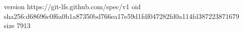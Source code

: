 version https://git-lfs.github.com/spec/v1
oid sha256:d68696c0f6a0b1a87350bd766ea17e59d1fdf047282fd0a114fd387223871679
size 7913

